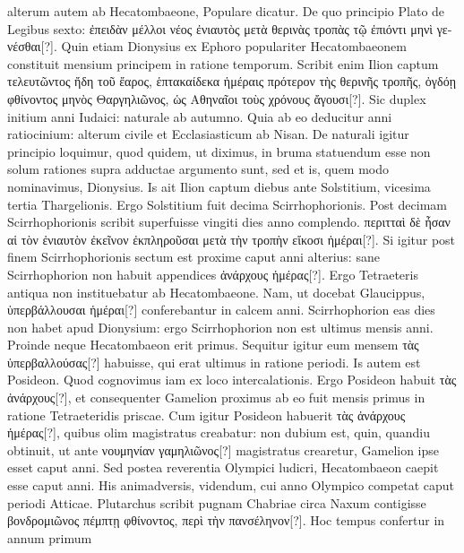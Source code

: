 alterum autem ab Hecatombaeone, Populare dicatur.
De quo
principio Plato de Legibus sexto:
 \textgreek{ἐπειδὰν μέλλοι νέος ἐνιαυτὸς μετὰ θερινὰς
τροπὰς τῷ ἐπιόντι μηνὶ γενέσθαι[?]}.
Quin etiam Dionysius ex Ephoro
populariter Hecatombaeonem constituit mensium principem in ratione
temporum.
Scribit enim Ilion captum \textgreek{τελευτῶντος ἤδη τοῦ ἔαρος,
ἑπτακαίδεκα ἡμέραις πρότερον τὴς θερινῆς τροπῆς, ὀγδόῃ φθίνοντος μηνὸς
Θαργηλιῶνος, ὡς Αθηναῖοι τοὺς χρόνους ἄγουσι[?]}.
Sic duplex initium anni
Iudaici: naturale ab autumno.
Quia ab eo deducitur anni ratiocinium:
alterum civile et Ecclasiasticum ab Nisan.
De naturali igitur
principio loquimur, quod quidem, ut diximus, in bruma statuendum
esse non solum rationes supra adductae argumento sunt, sed et is, quem
modo nominavimus, Dionysius.
Is ait Ilion captum  diebus
ante Solstitium, vicesima tertia Thargelionis.
Ergo Solstitium fuit
decima Scirrhophorionis.
Post decimam Scirrhophorionis scribit superfuisse
vingiti dies anno complendo.
\textgreek{περιτταὶ δὲ ἦσαν αἱ τὸν ἐνιαυτὸν
ἐκεῖνον ἐκπληροῦσαι μετὰ τὴν τροπὴν εἴκοσι ἡμέραι[?]}.
Si igitur post finem
Scirrhophorionis sectum est proxime caput anni alterius: sane Scirrhophorion
non habuit appendices \textgreek{ἀνάρχους ἡμέρας[?]}.
Ergo Tetraeteris
antiqua non instituebatur ab Hecatombaeone.
Nam, ut docebat
Glaucippus, \textgreek{ὑπερβάλλουσαι ἡμέραι[?]} conferebantur in calcem anni.
Scirrhophorion
eas dies non habet apud Dionysium: ergo Scirrhophorion
non est ultimus mensis anni.
Proinde neque Hecatombaeon erit primus.
Sequitur igitur eum mensem \textgreek{τὰς ὑπερβαλλούσας[?]}
 habuisse, qui
erat ultimus in ratione periodi.
Is autem est Posideon.
Quod cognovimus
iam ex loco intercalationis.
Ergo Posideon habuit \textgreek{τὰς ἀνάρχους[?]}, et
consequenter Gamelion proximus ab eo fuit mensis primus in ratione
Tetraeteridis priscae.
Cum igitur Posideon habuerit \textgreek{τὰς ἀνάρχους ἡμέρας[?]},
quibus olim magistratus creabatur: non dubium est, quin, quandiu
obtinuit, ut ante \textgreek{νουμηνίαν γαμηλιῶνος[?]} magistratus crearetur,
Gamelion ipse esset caput anni.
Sed postea reverentia Olympici ludicri,
Hecatombaeon caepit esse caput anni.
His animadversis, videndum,
cui anno Olympico competat caput periodi Atticae.
Plutarchus scribit
pugnam Chabriae circa Naxum contigisse \textgreek{βονδρομιῶνος πέμπτῃ
φθίνοντος, περὶ τὴν πανσέληνον[?]}.
Hoc tempus confertur in annum primum
